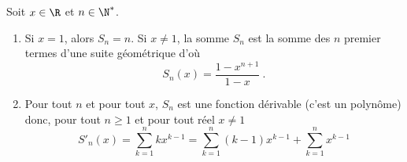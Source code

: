 	Soit $x\in \R$ et $n\in \N^*$.
	\begin{enumerate}
		\item Si $x=1$, alors $S_n = n$. Si $x\ne 1$, la somme $S_n$ est la somme des $n$ premier termes d'une suite géométrique d'où 
		\[
			S_n(x) = \frac{1-x^{n+1}}{1-x} \ .
		\]
		\item Pour tout $n$ et pour tout $x$, $S_n$ est une fonction dérivable (c'est un polynôme) donc, pour tout $n\geqslant 1$ et pour tout réel $x\ne 1$
		\[
			S'_n(x) = \sum_{k=1}^n kx^{k-1} = \sum_{k=1}^n (k-1)x^{k-1} + \sum_{k=1}^n x^{k-1}
		\]
	\end{enumerate}